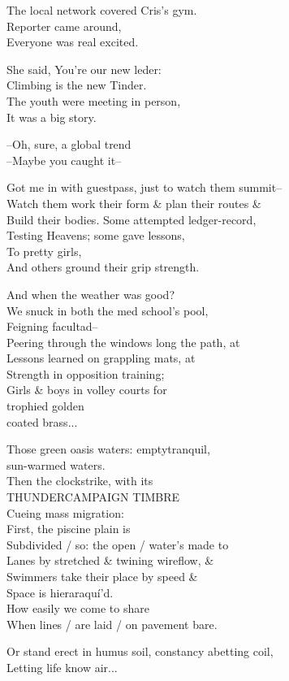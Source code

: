 
The local network covered Cris's gym. \\ 
Reporter came around,  \\
Everyone was real excited. 

She said, You're our new leder:  \\
Climbing is the new Tinder. \\
The youth were meeting in person, \\
It was a big story. 

--Oh, sure, a global trend\\
\qquad --Maybe you caught it--

Got me in with guestpass, just to watch them summit-- \\
Watch them work their form \& plan their routes \& \\
Build their bodies. Some attempted ledger-record, \\
Testing Heavens; some gave lessons, \\
To pretty girls, \\
And others ground their grip strength. 

And when the weather was good? \\ %
We snuck in both the med school's pool, \\
Feigning facultad-- \\
Peering through the windows long the path, at \\
Lessons learned on grappling mats, at \\
Strength in opposition training; \\
Girls \& boys in volley courts for \\
\quad trophied golden \\
\qquad coated brass...

Those green oasis waters: emptytranquil, \\
\quad sun-warmed waters. \\
Then the clockstrike, with its \\ 
THUNDERCAMPAIGN TIMBRE \\
Cueing mass migration: \\
First, the piscine plain is \\
Subdivided / so: the open / water's made to \\
Lanes by stretched \& twining wireflow, \& \\
Swimmers take their place by speed \& \\
Space is hieraraquí'd. \\
How easily we come to share \\
When lines / are laid / on pavement bare.

Or stand erect in humus soil, constancy abetting coil, \\
Letting life know air...